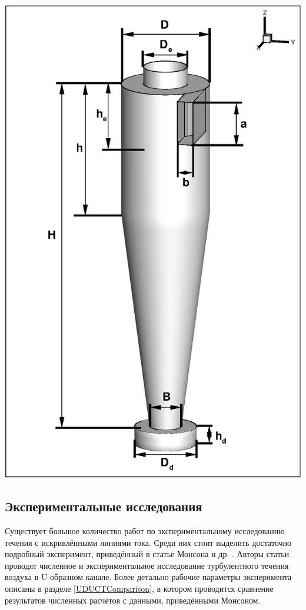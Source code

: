   \begin{minipage}{0.35\textwidth}
    \includegraphics[scale=0.45]{Geometry}
			    \label{fig:cycloneOverview}
  \end{minipage}
  
	\subsection{Экспериментальные исследования}
		Существует большое количество работ по экспериментальному исследованию течения с искривлёнными линиями тока. Среди них стоит выделить достаточно подробный эксперимент, приведённый в статье Монсона и др. \cite{Monson}. Авторы статьи проводят численное и экспериментальное исследование турбулентного течения воздуха в U-образном канале. Более детально рабочие параметры эксперимента описаны в разделе \ref{UDUCTComparison}, в котором проводится сравнение результатов численных расчётов с данными, приведёнными Монсоном.
		
